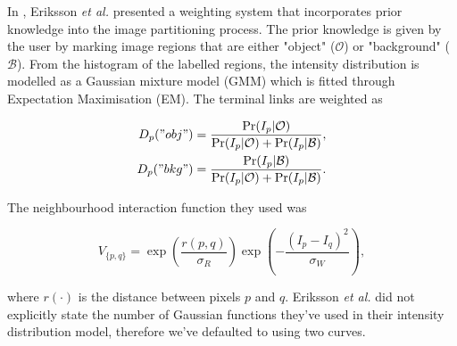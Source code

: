 \begin{definition} In \citep{Eriksson2006}, Eriksson \textit{et al.} presented a weighting system that incorporates prior knowledge into the image partitioning process. The prior knowledge is given by the user by marking image regions that are either "object" ($\mathcal{O}$) or "background" ($\mathcal{B}$). From the histogram of the labelled regions, the intensity distribution is modelled as a Gaussian mixture model (GMM) which is fitted through Expectation Maximisation (EM). The terminal links are weighted as
	
\begin{align}
	D_p("obj") &= \frac{\Pr(I_p|\mathcal{O})}{\Pr(I_p|\mathcal{O})+\Pr(I_p|\mathcal{B})}, \\
	D_p("bkg") &= \frac{\Pr(I_p|\mathcal{B})}{\Pr(I_p|\mathcal{O})+\Pr(I_p|\mathcal{B})}.
\end{align}

The neighbourhood interaction function they used was
	
\begin{equation}
	V_{\{p,q\}} = \exp\left( \frac{r(p,q)}{\sigma_R} \right)\exp\left( -\frac{(I_p-I_q)^2}{\sigma_W} \right),
\end{equation}
	
where $r(\cdot)$ is the distance between pixels $p$ and $q$. Eriksson \textit{et al.} did not explicitly state the number of Gaussian functions they've used in their intensity distribution model, therefore we've defaulted to using two curves.
	
\end{definition}

